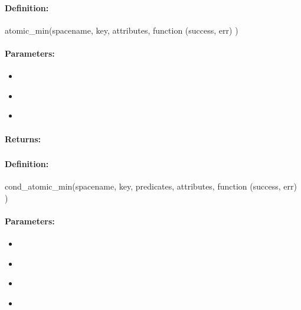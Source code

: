 \paragraph{Definition:}
\begin{javascriptcode}
atomic_min(spacename, key, attributes, function (success, err) {})
\end{javascriptcode}
\paragraph{Parameters:}
\begin{itemize}[noitemsep]
\item {}\\

\item {}\\

\item {}\\

\end{itemize}

\paragraph{Returns:}


\pagebreak
\subsubsection{}
\label{api:nodejs:cond_atomic_min}


\paragraph{Definition:}
\begin{javascriptcode}
cond_atomic_min(spacename, key, predicates, attributes, function (success, err) {})
\end{javascriptcode}
\paragraph{Parameters:}
\begin{itemize}[noitemsep]
\item {}\\

\item {}\\

\item {}\\

\item {}\\

\end{itemize}

